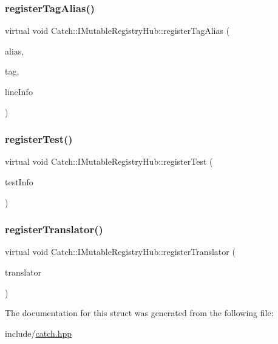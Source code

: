 \subsubsection{\texorpdfstring{register\+Tag\+Alias()}{registerTagAlias()}}
{\footnotesize\ttfamily virtual void Catch\+::\+I\+Mutable\+Registry\+Hub\+::register\+Tag\+Alias (\begin{DoxyParamCaption}\item[{std\+::string const \&}]{alias,  }\item[{std\+::string const \&}]{tag,  }\item[{\mbox{\hyperlink{structCatch_1_1SourceLineInfo}{Source\+Line\+Info}} const \&}]{line\+Info }\end{DoxyParamCaption})\hspace{0.3cm}{\ttfamily [pure virtual]}}

\mbox{\label{structCatch_1_1IMutableRegistryHub_a11b85c6744d88c9f83fe16ad4a8dd451}} 
\subsubsection{\texorpdfstring{register\+Test()}{registerTest()}}
{\footnotesize\ttfamily virtual void Catch\+::\+I\+Mutable\+Registry\+Hub\+::register\+Test (\begin{DoxyParamCaption}\item[{\mbox{\hyperlink{classCatch_1_1TestCase}{Test\+Case}} const \&}]{test\+Info }\end{DoxyParamCaption})\hspace{0.3cm}{\ttfamily [pure virtual]}}

\mbox{\label{structCatch_1_1IMutableRegistryHub_ae6825365102693cf7707db022a2c2b49}} 
\subsubsection{\texorpdfstring{register\+Translator()}{registerTranslator()}}
{\footnotesize\ttfamily virtual void Catch\+::\+I\+Mutable\+Registry\+Hub\+::register\+Translator (\begin{DoxyParamCaption}\item[{const \mbox{\hyperlink{structCatch_1_1IExceptionTranslator}{I\+Exception\+Translator}} $\ast$}]{translator }\end{DoxyParamCaption})\hspace{0.3cm}{\ttfamily [pure virtual]}}



The documentation for this struct was generated from the following file\+:\begin{DoxyCompactItemize}
\item 
include/\mbox{\hyperlink{catch_8hpp}{catch.\+hpp}}\end{DoxyCompactItemize}
